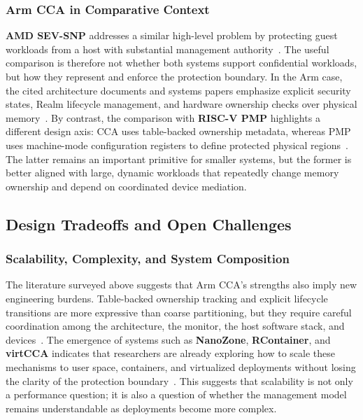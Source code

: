 \subsubsection{Arm CCA in Comparative Context}

\textbf{AMD SEV-SNP} addresses a similar high-level problem by protecting guest workloads from a host with substantial management authority~\cite{amd_sev,amd_sev_snp}. The useful comparison is therefore not whether both systems support confidential workloads, but how they represent and enforce the protection boundary. In the Arm case, the cited architecture documents and systems papers emphasize explicit security states, Realm lifecycle management, and hardware ownership checks over physical memory~\cite{li2022cca,arm_cca_spec,arm_rme_spec}. By contrast, the comparison with \textbf{RISC-V PMP} highlights a different design axis: CCA uses table-backed ownership metadata, whereas PMP uses machine-mode configuration registers to define protected physical regions~\cite{arm_cca_spec,arm_rme_spec,riscv_privileged}. The latter remains an important primitive for smaller systems, but the former is better aligned with large, dynamic workloads that repeatedly change memory ownership and depend on coordinated device mediation.

\subsection{Design Tradeoffs and Open Challenges}

\subsubsection{Scalability, Complexity, and System Composition}

The literature surveyed above suggests that Arm CCA's strengths also imply new engineering burdens. Table-backed ownership tracking and explicit lifecycle transitions are more expressive than coarse partitioning, but they require careful coordination among the architecture, the monitor, the host software stack, and devices~\cite{li2022cca,arm_cca_spec,arm_rme_spec,arm_rmm_spec}. The emergence of systems such as \textbf{NanoZone}, \textbf{RContainer}, and \textbf{virtCCA} indicates that researchers are already exploring how to scale these mechanisms to user space, containers, and virtualized deployments without losing the clarity of the protection boundary~\cite{liu2025nanozone,zhou2025rcontainer,xu2026virtcca}. This suggests that scalability is not only a performance question; it is also a question of whether the management model remains understandable as deployments become more complex.

